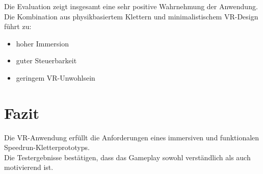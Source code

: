 \documentclass[11pt,a4paper]{article}
\begin{document}
Die Evaluation zeigt insgesamt eine sehr positive Wahrnehmung der Anwendung.
\\
Die Kombination aus physikbasiertem Klettern und minimalistischem VR-Design führt zu:

\begin{itemize}
    \item hoher Immersion
    \item guter Steuerbarkeit
    \item geringem VR-Unwohlsein
\end{itemize}

\section{Fazit}

Die VR-Anwendung erfüllt die Anforderungen eines immersiven und funktionalen Speedrun-Kletterprototyps.
\\
Die Testergebnisse bestätigen, dass das Gameplay sowohl verständlich als auch motivierend ist.
\end{document}
